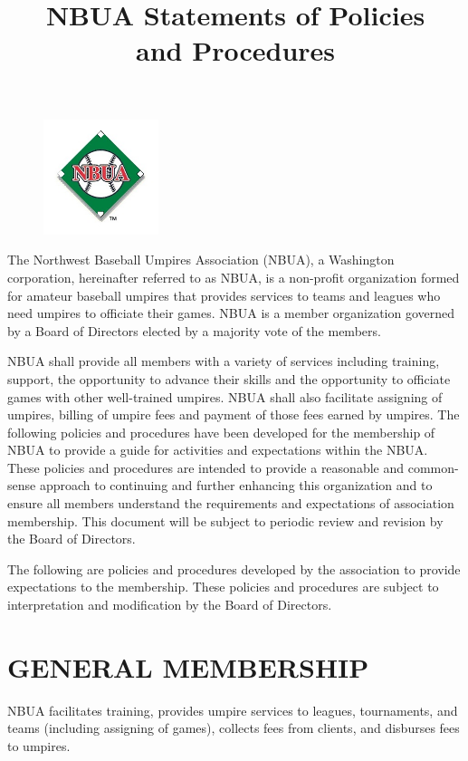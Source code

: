 \documentclass[letterpaper,11pt,colorlinks=true,allcolors=blue]{article}
\title{NBUA Statements of Policies \\ and Procedures}
\begin{document}
\begin{figure}
\centering
\includegraphics[width=0.3\textwidth]{NBUALogo.jpg}
\end{figure}


\maketitle

The Northwest Baseball Umpires Association (NBUA), a Washington corporation, hereinafter referred to as NBUA, is a non-profit organization formed for amateur baseball umpires that provides services to teams and leagues who need umpires to officiate their games.  NBUA is a member organization governed by a Board of Directors elected by a majority vote of the members.

NBUA shall provide all members with a variety of services including training, support, the opportunity to advance their skills and the opportunity to officiate games with other well-trained umpires. NBUA shall also facilitate assigning of umpires, billing of umpire fees and payment of those fees earned by umpires. The following policies and procedures have been developed for the membership of NBUA to provide a guide for activities and expectations within the NBUA. These policies and procedures are intended to provide a reasonable and common-sense approach to continuing and further enhancing this organization and to ensure all members understand the requirements and expectations of association membership.  This document will be subject to periodic review and revision by the Board of Directors.

The following are policies and procedures developed by the association to provide expectations to the membership. These policies and procedures are subject to interpretation and modification by the Board of Directors.

\newpage
\section{GENERAL MEMBERSHIP}
NBUA facilitates training, provides umpire services to leagues, tournaments, and teams (including assigning of games), collects fees from clients, and disburses fees to umpires.
\end{document}
